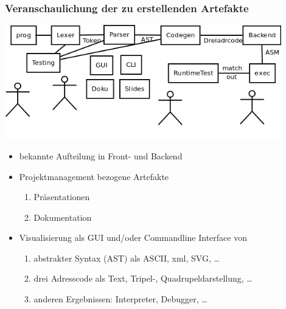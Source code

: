 \documentclass[ucs,9pt]{beamer}
\begin{document}
\begin{frame}
    \frametitle{Veranschaulichung der zu erstellenden Artefakte}
    \begin{center}
        \includegraphics[width=0.9\textwidth]{pipeline}
    \end{center}
    \begin{itemize}
        \item bekannte Aufteilung in Front- und Backend
        \item Projektmanagement bezogene Artefakte
            \begin{enumerate}
                \item Präsentationen
                \item Dokumentation
            \end{enumerate}
        \item Visualisierung als GUI und/oder Commandline Interface von
            \begin{enumerate}
                \item abstrakter Syntax (AST) als ASCII, xml, SVG, \dots
                \item drei Adresscode als Text, Tripel-, Quadrupeldarstellung,
                    \dots
                \item anderen Ergebnissen: Interpreter, Debugger, \dots
            \end{enumerate}
    \end{itemize}
\end{frame}
\end{document}
